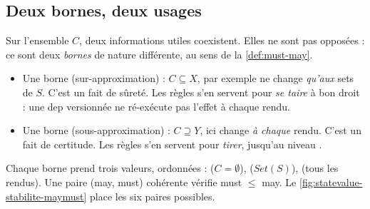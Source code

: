 \subsection{Deux bornes, deux usages}

Sur l'ensemble $C$, deux informations utiles coexistent. Elles ne sont pas
opposées : ce sont deux \emph{bornes} de nature différente, au sens de la
\cref{def:must-may}.
\begin{itemize}
  \item Une borne  (sur-approximation) : \og $C \subseteq X$\fg{},
    par exemple \og ne change \emph{qu'aux} sets de $S$\fg{}. C'est un fait
    de sûreté. Les règles s'en servent pour \emph{se taire} à bon droit : une
    dep versionnée ne ré-exécute pas l'effet à chaque rendu.
  \item Une borne  (sous-approximation) : \og $C \supseteq
    Y$\fg{}, ici \og change \emph{à chaque} rendu\fg{}. C'est un fait de
    certitude. Les règles s'en servent pour \emph{tirer}, jusqu'au niveau
    \Error{}.
\end{itemize}
Chaque borne prend trois valeurs, ordonnées :  ($C = \emptyset$),
 ($\mathit{Set}(S)$),  (tous les rendus). Une paire
(may, must) cohérente vérifie must $\le$ may. Le \cref{fig:statevalue-stabilite-maymust}
place les six paires possibles.

